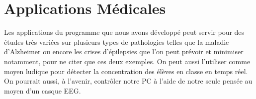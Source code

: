 	\section{Applications Médicales} %
		Les applications du programme que nous avons développé peut servir pour des études très variées sur plusieurs types de pathologies telles que la maladie d'Alzheimer ou encore les crises d'épilepsies que l'on peut prévoir et minimiser notamment, pour ne citer que ces deux exemples. On peut aussi l'utiliser comme moyen ludique pour détecter la concentration des élèves en classe en temps réel. On pourrait aussi, à l'avenir, contrôler notre PC à l'aide de notre seule pensée au moyen d'un casque EEG.
	\label{sec:application_médical}
	
				
	
	
	
	

